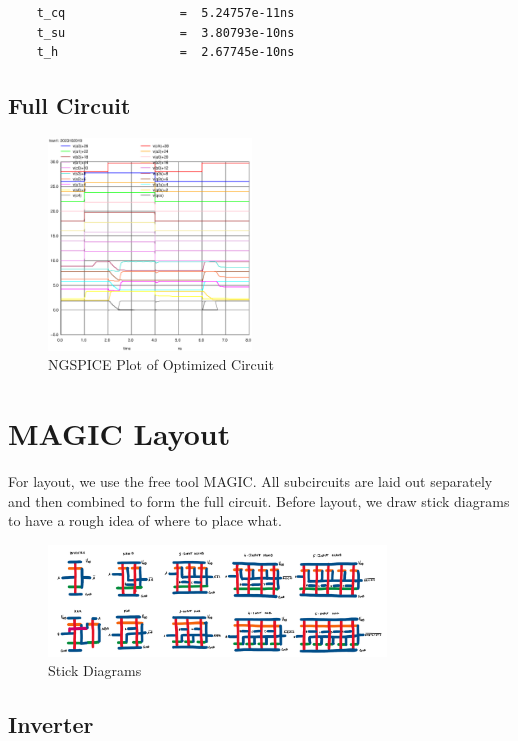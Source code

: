 \documentclass[conference]{IEEEtran}
\begin{document}
\begin{verbatim}
    t_cq                =  5.24757e-11ns
    t_su                =  3.80793e-10ns
    t_h                 =  2.67745e-10ns
\end{verbatim}

\subsection{Full Circuit}

\begin{figure}[H]
    \centering
    \includegraphics[width=0.48\textwidth]{images/full_optimized_tran.eps}
    \caption{NGSPICE Plot of Optimized Circuit}
\end{figure}

\section{MAGIC Layout}
For layout, we use the free tool MAGIC. All subcircuits are laid out separately and then combined to form the full circuit. Before layout, we draw stick diagrams to have a rough idea of where to place what.

\begin{figure}[t]
    \centering
    \includegraphics[width=0.8\textwidth]{images/stick_diagrams.png}
    \caption{Stick Diagrams}
\end{figure}

\subsection{Inverter}
\end{document}
